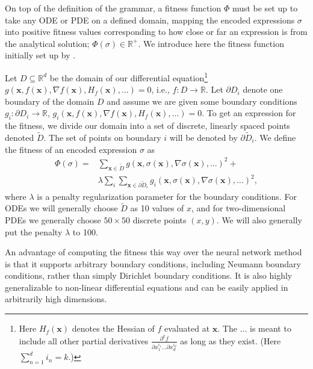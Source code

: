 \documentclass[aps,reprint,superscriptaddress,nofootinbib]{revtex4-2}
\begin{document}
On top of the definition of the grammar, a fitness function \(\Phi\) must be set up to take any ODE or PDE on a defined domain, mapping the encoded expressions \(\sigma\) into positive fitness values corresponding to how close or far an expression is from the analytical solution; \(\Phi(\sigma) \in \mathbb{R}^+\). We introduce here the fitness function initially set up by \cite{solving_diff_reproduce}.

Let \(D\subseteq\mathbb{R}^d\) be the domain of our differential equation\footnote{Here \(H_f(\bm{x})\) denotes the Hessian of \(f\) evaluated at \(\bm{x}\). The \(\ldots\) is meant to include all other partial derivatives \(\frac{\partial^k f}{\partial x_1^{i_1}\ldots\partial x_d^{i_d}}\) as long as they exist. (Here \(\sum_{n=1}^di_n=k\).)} \(g\left(\bm x, f(\bm x), \nabla f(\bm x), H_f(\bm x), \ldots\right) = 0\), i.e., \(f:D\to\mathbb{R}\). Let \(\partial D_i\) denote one boundary of the domain \(D\) and assume we are given some boundary conditions \(g_i:\partial D_i\to\mathbb{R}\), \(g_i\left(\bm x, f(\bm x), \nabla f(\bm x), H_f(\bm x), \ldots\right) = 0\). To get an expression for the fitness, we divide our domain into a set of discrete, linearly spaced points denoted \(\widetilde{D}\). The set of points on boundary \(i\) will be denoted by \(\partial\widetilde{D}_i\). We define the fitness of an encoded expression \(\sigma\) as
\begin{align*}
    \Phi(\sigma) = &\sum_{\bm{x}\in\widetilde{D}}g\left(\bm{x}, \sigma(\bm{x}), \nabla\sigma(\bm{x}), \ldots\right)^2 + 
    \\
    &\lambda\sum_i\sum_{\bm{x}\in\partial\widetilde{D}_i}g_i\left(\bm{x}, \sigma(\bm{x}), \nabla\sigma(\bm{x}), \ldots\right)^2,
\end{align*}
where \(\lambda\) is a penalty regularization parameter for the boundary conditions. For ODEs we will generally choose \(\widetilde{D}\) as 10 values of \(x\), and for two-dimensional PDEs we generally choose \(50\times50\) discrete points \((x, y)\). We will also generally put the penalty \(\lambda\) to 100.

An advantage of computing the fitness this way over the neural network method is that it supports arbitrary boundary conditions, including Neumann boundary conditions, rather than simply Dirichlet boundary conditions. It is also highly generalizable to non-linear differential equations and can be easily applied in arbitrarily high dimensions.
\end{document}
